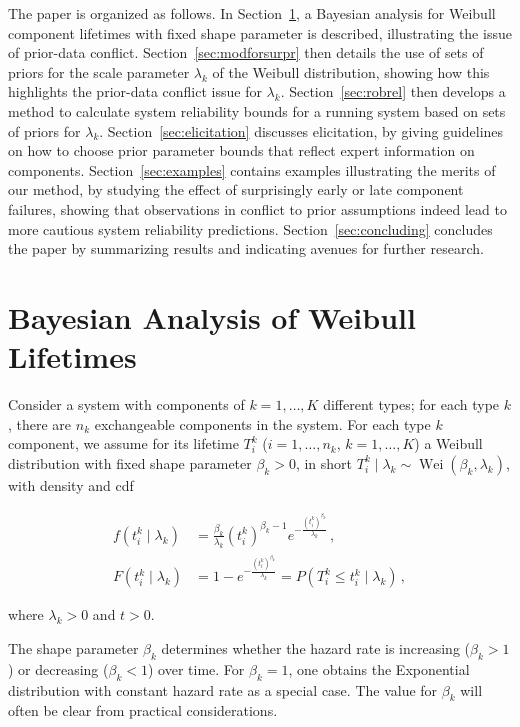 \documentclass[Journal,letterpaper]{ascelike-new}
\newcommand{\wei}{\operatorname{Wei}} %
\begin{document}
The paper is organized as follows.
In Section~\ref{sec:weibull}, a Bayesian analysis for Weibull component lifetimes
with fixed shape parameter is described,
illustrating the issue of prior-data conflict.
Section~\ref{sec:modforsurpr} then details the use of sets of priors
for the scale parameter $\lambda_k$ of the Weibull distribution,
showing how this highlights the prior-data conflict issue for $\lambda_k$.
Section~\ref{sec:robrel} then develops a method to calculate system reliability bounds
for a running system based on sets of priors for $\lambda_k$. 
Section~\ref{sec:elicitation} discusses elicitation,
by giving guidelines on how to choose prior parameter bounds
that reflect expert information on components.
Section~\ref{sec:examples} contains examples illustrating the merits of our method,
by studying the effect of surprisingly early or late component failures,
showing that observations in conflict to prior assumptions
indeed lead to more cautious system reliability predictions.
Section~\ref{sec:concluding} concludes the paper by summarizing results
and indicating avenues for further research.

\section{Bayesian Analysis of Weibull Lifetimes}
\label{sec:weibull}

Consider a system with components of $k=1,\ldots,K$ different types;
for each type $k$, there are $n_k$ exchangeable components in the system.
For each type $k$ component, we assume for its lifetime $T_i^k$ ($i=1,\ldots,n_k$, $k = 1, \ldots, K$)
a Weibull distribution with fixed shape parameter $\beta_k > 0$,
in short $T_i^k \mid \lambda_k \sim \wei(\beta_k,\lambda_k)$,
with density and cdf%
\begin{linenomath*}
\begin{align}
\label{eq:weibulldens}
f(t_i^k \mid \lambda_k) &= \frac{\beta_k}{\lambda_k} (t_i^k)^{\beta_k-1} e^{-\frac{(t_i^k)^{\beta_k}}{\lambda_k}}\,, \\
\label{eq:weibullcdf}
F(t_i^k \mid \lambda_k) &= 1 - e^{-\frac{(t_i^k)^{\beta_k}}{\lambda_k}} = P(T_i^k \leq t_i^k \mid \lambda_k)\,,
\end{align}
\end{linenomath*}
where $\lambda_k > 0$ and $t > 0$.

The shape parameter $\beta_k$ determines whether the hazard rate is increasing ($\beta_k > 1$)
or decreasing ($\beta_k < 1$) over time.
For $\beta_k=1$, one obtains the Exponential distribution with constant hazard rate as a special case.
The value for $\beta_k$ will often be clear from practical considerations.
\end{document}
